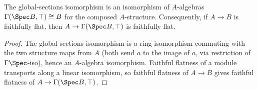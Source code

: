 \begin{lemma}
  \label{lem:faithfullyFlat_sectionsTop}
  \leanok
  The global-sections isomorphism is an isomorphism of \(A\)-algebras \(\Gamma(\Spec B, \top)
  \cong B\) for the composed \(A\)-structure. Consequently, if \(A \to B\) is faithfully flat,
  then \(A \to \Gamma(\Spec B, \top)\) is faithfully flat.
\end{lemma}
\begin{proof}
  \leanok
  The global-sections isomorphism is a ring isomorphism commuting with the two structure maps
  from \(A\) (both send \(a\) to the image of \(a\), via restriction of \(\Gamma\Spec\)-iso),
  hence an \(A\)-algebra isomorphism. Faithful flatness of a module transports along a linear
  isomorphism, so faithful flatness of \(A \to B\) gives faithful flatness of \(A \to
  \Gamma(\Spec B, \top)\).
\end{proof}

